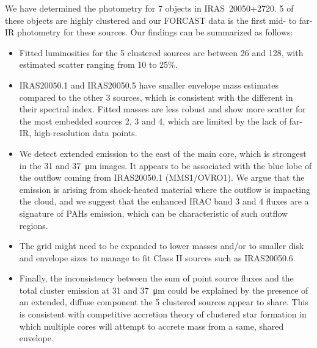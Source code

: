 We have determined the photometry for 7 objects in IRAS~20050+2720. 5 of these objects are highly clustered and our FORCAST data is the first mid- to far-IR photometry for these sources. Our findings can be summarized as follows:
\begin{itemize}
\item Fitted luminosities for the 5 clustered sources are between 26 and \SI{128}{\Lsun}, with estimated scatter ranging from 10 to 25\%. 
\item IRAS20050.1 and IRAS20050.5 have smaller envelope mass estimates compared to the other 3 sources, which is consistent with the different in their spectral index. Fitted masses are less robust and show more scatter for the most embedded sources 2, 3 and 4, which are limited by the lack of far-IR, high-resolution data points.
\item We detect extended emission to the east of the main core, which is strongest in the 31 and \SI{37}{\um} images. It appears to be associated with the blue lobe of the outflow coming from IRAS20050.1 (MMS1/OVRO1). We argue that the emission is arising from shock-heated material where the outflow is impacting the cloud, and we suggest that the enhanced IRAC band 3 and 4 fluxes are a signature of PAHs emission, which can be characteristic of such outflow regions.
\item The grid might need to be expanded to lower masses and/or to smaller disk and envelope sizes to manage to fit Class II sources such as IRAS20050.6.
\item Finally, the inconsistency between the sum of point source fluxes and the total cluster emission at 31 and \SI{37}{\um} could be explained by the presence of an extended, diffuse component the 5 clustered sources appear to share. This is consistent with competitive accretion theory of clustered star formation in which multiple cores will attempt to accrete mass from a same, shared envelope.
\end{itemize}



